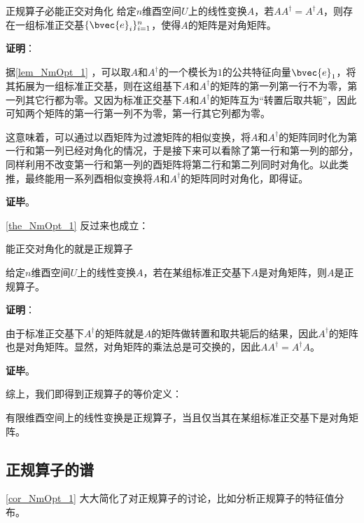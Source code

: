 \begin{theorem}{正规算子必能正交对角化}\label{the_NmOpt_1}
给定$n$维酉空间$U$上的线性变换$A$，若$AA^\dagger = A^\dagger A$，则存在一组标准正交基$\{\bvec{e}_i\}_{i=1}^n$，使得$A$的矩阵是对角矩阵。
\end{theorem}

\textbf{证明}：

据\autoref{lem_NmOpt_1} ，可以取$A$和$A^\dagger$的一个模长为$1$的公共特征向量$\bvec{e}_1$，将其拓展为一组标准正交基，则在这组基下$A$和$A^\dagger$的矩阵的第一列第一行不为零，第一列其它行都为零。又因为标准正交基下$A$和$A^\dagger$的矩阵互为“转置后取共轭”，因此可知两个矩阵的第一行第一列不为零，第一行其它列都为零。

这意味着，可以通过以酉矩阵为过渡矩阵的相似变换，将$A$和$A^\dagger$的矩阵同时化为第一行和第一列已经对角化的情况，于是接下来可以看除了第一行和第一列的部分，同样利用不改变第一行和第一列的酉矩阵将第二行和第二列同时对角化。以此类推，最终能用一系列酉相似变换将$A$和$A^\dagger$的矩阵同时对角化，即得证。

\textbf{证毕}。


\autoref{the_NmOpt_1} 反过来也成立：


\begin{theorem}{能正交对角化的就是正规算子}

给定$n$维酉空间$U$上的线性变换$A$，若在某组标准正交基下$A$是对角矩阵，则$A$是正规算子。

\end{theorem}

\textbf{证明}：

由于标准正交基下$A^\dagger$的矩阵就是$A$的矩阵做转置和取共轭后的结果，因此$A^\dagger$的矩阵也是对角矩阵。显然，对角矩阵的乘法总是可交换的，因此$AA^\dagger = A^\dagger A$。

\textbf{证毕}。


综上，我们即得到正规算子的等价定义：


\begin{corollary}{}
有限维酉空间上的线性变换是正规算子，当且仅当其在某组标准正交基下是对角矩阵。
\end{corollary}






\subsection{正规算子的谱}



\autoref{cor_NmOpt_1} 大大简化了对正规算子的讨论，比如分析正规算子的特征值分布。


